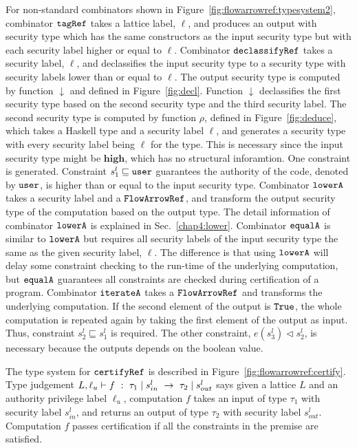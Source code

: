 \documentclass[a4paper]{report}
\newcommand{\co}[1]{$\cod{#1}$}
\newcommand{\sts}[1]{s_{#1}^l}
\newcommand{\guard}{\lhd}
\newcommand{\decl}{\downarrow}
\newcommand{\typn}[1]{\tau_{#1}}
\newcommand{\res}[2]{{#1}\mid {#2}}
\begin{document}
For non-standard combinators shown in Figure~\ref{fig:flowarrowref:typesystem2},
combinator \co{tagRef} takes a lattice label, $\ell$, and produces an output
with security type which has the same constructors as the input security type but with each security label
higher or equal to $\ell$. 
Combinator \co{declassifyRef} takes a security label, $\ell$, and declassifies the input security type to
a security type with security labels lower than or equal to $\ell$. 
The output security type is computed by function $\decl$ and defined in Figure~\ref{fig:decl}.
Function $\decl$ declassifies the first security type based on the second security type and the third
security label.
The second security type is computed by function $\rho$, defined in Figure~\ref{fig:deduce}, which takes 
a Haskell type and a security label $\ell$, and generates a security type with every security label 
being $\ell$ for the type.
This is necessary since the input security type might be $\mathbf{high}$, which has no structural inforamtion.
One constraint is generated.
Constraint $\sts{1}\sqsubseteq \cod{user}$ guarantees the authority of the code, denoted by \co{user}, is 
higher than or equal to the input security type. 
Combinator \co{lowerA} takes a security label
and a \co{FlowArrowRef}, and transform the output security type of the computation based on the output
type. 
The detail information of combinator \co{lowerA} is explained in Sec.~\ref{chap4:lower}.
Combinator \co{equalA} is similar to \co{lowerA} but requires all security labels of the input security
type the same as the given security label, $\ell$. The difference is that using \co{lowerA} will delay
some constraint checking to the run-time of the underlying computation, but \co{equalA} guarantees
all constraints are checked during certification of a program.
Combinator \co{iterateA} takes a \co{FlowArrowRef} and transforms the underlying computation.
If the second element of the output is \co{True}, the whole computation is repeated again by taking
the first element of the output as input. Thus, constraint $\sts{2}\sqsubseteq \sts{1}$ is required.
The other constraint, $e(\sts{3})\guard \sts{2}$, is necessary because the outputs depends on the boolean value.

The type system for \co{certifyRef} is described in Figure~\ref{fig:flowarrowref:certify}. Type judgement
$L,\ell_u\proves f~:~\res{\typn{1}}{\sts{in}}~->~\res{\typn{2}}{\sts{out}}$ says given a lattice $L$ and 
an authority privilege label $\ell_u$, computation $f$ takes an input of type $\typn{1}$ with security 
label $\sts{in}$, and returns an output of type $\typn{2}$ with security label $\sts{out}$.
Computation $f$ passes certification if all the constraints in the premise are satisfied.
\end{document}
